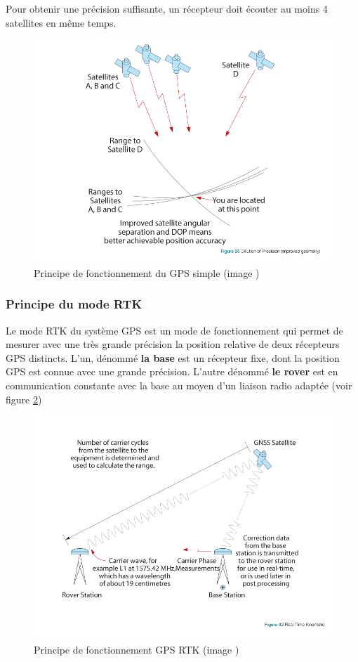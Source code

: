 \documentclass[12pt,a4paper]{report}
\begin{document}
		\para Pour obtenir une précision suffisante, un récepteur doit écouter au moins 4 satellites en même temps.
		
		\begin{figure}[h!]
			\centering
			\includegraphics[width=0.7\linewidth]{img/gnss}
			\caption[gpssimple]{Principe de fonctionnement du GPS simple (image \cite{jeffrey_introduction_2010})}
			\label{fig:gnss}
		\end{figure}
		
		\subsubsection{Principe du mode RTK}
		Le mode RTK du système GPS est un mode de fonctionnement qui permet de mesurer avec une très grande précision la position relative de deux récepteurs GPS distincts. L'un, dénommé \textbf{la base} est un récepteur fixe, dont la position GPS est connue avec une grande précision. L'autre dénommé \textbf{le rover} est en communication constante avec la base au moyen d'un liaison radio adaptée (voir figure \ref{fig:rtk})
		
		\begin{figure}[h!]
			\centering
			\includegraphics[width=0.7\linewidth]{img/rtk}
			\caption[gpsrtk]{Principe de fonctionnement GPS RTK (image \cite{jeffrey_introduction_2010}) }
			\label{fig:rtk}
		\end{figure}
	
\end{document}
